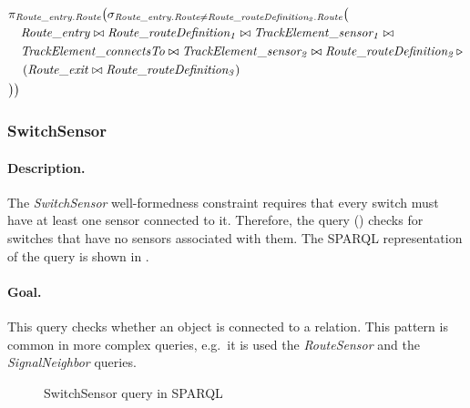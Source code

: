 \begin{align*}
& \pi_{\mathit{Route\_entry.Route}} \big( \sigma_{\mathit{Route\_entry.Route} \neq \mathit{Route\_routeDefinition_2.Route}} \big( \\
& \quad \mathit{Route\_entry} \bowtie \mathit{Route\_routeDefinition_1} \bowtie \mathit{TrackElement\_sensor_1} \bowtie \\
& \quad \mathit{TrackElement\_connectsTo} \bowtie \mathit{TrackElement\_sensor_2} \bowtie \mathit{Route\_routeDefinition_2} \, \triangleright \, \\
& \quad \left( \mathit{Route\_exit} \bowtie \mathit{Route\_routeDefinition_3} \right) \\
& \big) \big)
\end{align*}

\subsubsection{SwitchSensor}

\paragraph{Description.} The \textit{SwitchSensor} well-formedness constraint requires that every switch must have at least one sensor connected to it. Therefore, the query () checks for switches that have no sensors associated with them. The SPARQL representation of the query is shown in .

\paragraph{Goal.} This query checks whether an object is connected to a relation. This pattern is common in more complex queries, e.g.\ it is used the \textit{RouteSensor} and the \textit{SignalNeighbor} queries.

\begin{figure}[Htb]
\centering
\begin{minipage}{0.5\textwidth}
  { \alignListing
    }
  \caption{SwitchSensor query in SPARQL}
  \label{lst:switchsensor-sparql}
\end{minipage}
\end{figure}

% 
% 


